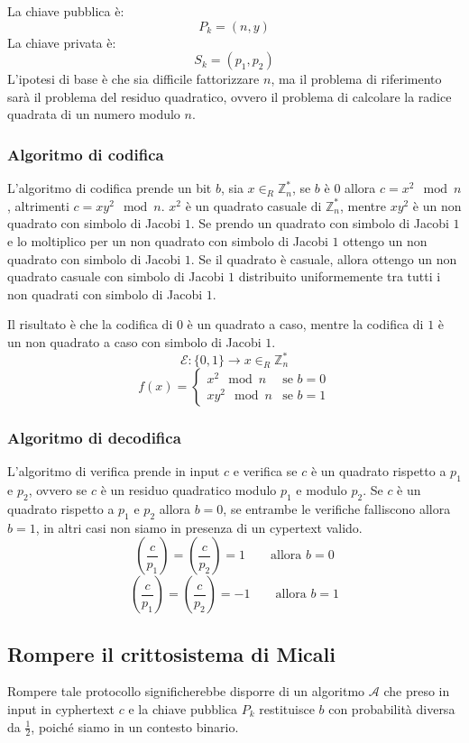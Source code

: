 La chiave pubblica è:
\[
  P_k = (n, y)
\]
La chiave privata è:
\[
  S_k = (p_1, p_2)
\]
L'ipotesi di base è che sia difficile fattorizzare $n$, ma il problema di 
riferimento sarà il problema del residuo quadratico, ovvero il problema di
calcolare la radice quadrata di un numero modulo $n$.
\subsubsection{Algoritmo di codifica}
L'algoritmo di codifica prende un bit $b$, sia $x \in_R \mathbb{Z}_n^*$, se 
$b$ è $0$ allora $c = x^2 \mod n$, altrimenti $c = xy^2 \mod n$. 
$x^2$ è un quadrato casuale di $\mathbb{Z}_n^*$, mentre $xy^2$ è un 
non quadrato con simbolo di Jacobi $1$. Se prendo un quadrato con simbolo di 
Jacobi $1$ e lo moltiplico per un non quadrato con simbolo di Jacobi $1$ ottengo
un non quadrato con simbolo di Jacobi $1$. Se il quadrato è casuale, allora 
ottengo un non quadrato casuale con simbolo di Jacobi $1$ distribuito uniformemente
tra tutti i non quadrati con simbolo di Jacobi $1$.

Il risultato è che la codifica di $0$ è un quadrato a caso, mentre la codifica di $1$ è
un non quadrato a caso con simbolo di Jacobi $1$.
\[
  \mathcal{E}: \{0, 1\} \to x \in_R \mathbb{Z}_n^*
\]
\[
  f(x) = \begin{cases}
    x^2 \mod n & \text{se } b = 0\\
    xy^2 \mod n & \text{se } b = 1
  \end{cases}
\]
\subsubsection{Algoritmo di decodifica}
L'algoritmo di verifica prende in input $c$ e verifica se $c$ è un quadrato 
rispetto a $p_1$ e $p_2$, ovvero se $c$ è un residuo quadratico modulo $p_1$ e
modulo $p_2$. Se $c$ è un quadrato rispetto a $p_1$ e $p_2$ allora $b = 0$,
se entrambe le verifiche falliscono allora $b = 1$, in altri casi non siamo in presenza 
di un cypertext valido.
\[
  \left(\frac{c}{p_1}\right) = \left(\frac{c}{p_2}\right) = 1 \qquad \text{allora } b = 0
\]
\[
  \left(\frac{c}{p_1}\right) = \left(\frac{c}{p_2}\right) = -1 \qquad \text{allora } b = 1
\]
\subsection{Rompere il crittosistema di Micali}
Rompere tale protocollo significherebbe disporre di un algoritmo $\mathcal{A}$ che preso in 
input in cyphertext $c$ e la chiave pubblica $P_k$ restituisce $b$ con probabilità
diversa da $\frac{1}{2}$, poiché siamo in un contesto binario.

